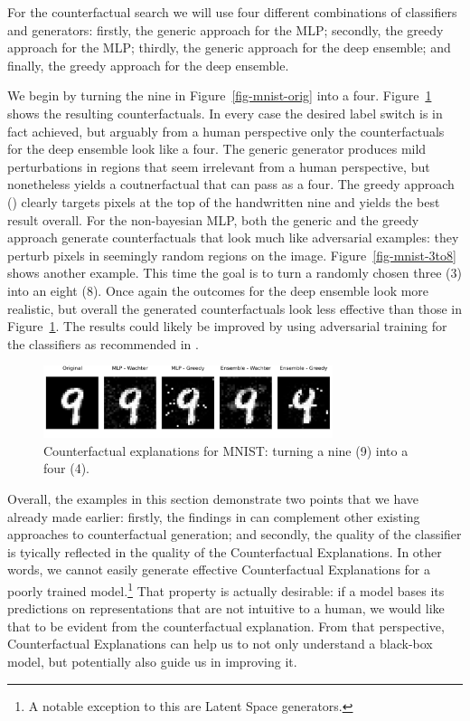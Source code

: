 \documentclass{juliacon}
\begin{document}
For the counterfactual search we will use four different combinations of
classifiers and generators: firstly, the generic approach for the MLP;
secondly, the greedy approach for the MLP; thirdly, the generic approach
for the deep ensemble; and finally, the greedy approach for the deep
ensemble.

We begin by turning the nine in Figure~\ref{fig-mnist-orig} into a four.
Figure~\ref{fig-mnist-9to4} shows the resulting counterfactuals. In
every case the desired label switch is in fact achieved, but arguably
from a human perspective only the counterfactuals for the deep ensemble
look like a four. The generic generator produces mild perturbations in
regions that seem irrelevant from a human perspective, but nonetheless
yields a coutnerfactual that can pass as a four. The greedy approach
(\cite{schut2021generating}) clearly targets pixels at the top of the
handwritten nine and yields the best result overall. For the
non-bayesian MLP, both the generic and the greedy approach generate
counterfactuals that look much like adversarial examples: they perturb
pixels in seemingly random regions on the image.
Figure~\ref{fig-mnist-3to8} shows another example. This time the goal is
to turn a randomly chosen three (3) into an eight (8). Once again the
outcomes for the deep ensemble look more realistic, but overall the
generated counterfactuals look less effective than those in
Figure~\ref{fig-mnist-9to4}. The results could likely be improved by
using adversarial training for the classifiers as recommended in
\cite{schut2021generating}.

\begin{figure}

{\centering \includegraphics[width=3.33333in,height=0.83333in]{www/mnist_9_to_4.png}

}

\caption{\label{fig-mnist-9to4}Counterfactual explanations for MNIST:
turning a nine (9) into a four (4).}

\end{figure}

Overall, the examples in this section demonstrate two points that we
have already made earlier: firstly, the findings in
\cite{schut2021generating} can complement other existing approaches to
counterfactual generation; and secondly, the quality of the classifier
is tyically reflected in the quality of the Counterfactual Explanations.
In other words, we cannot easily generate effective Counterfactual
Explanations for a poorly trained model.\footnote{A notable exception to
  this are Latent Space generators.} That property is actually
desirable: if a model bases its predictions on representations that are
not intuitive to a human, we would like that to be evident from the
counterfactual explanation. From that perspective, Counterfactual
Explanations can help us to not only understand a black-box model, but
potentially also guide us in improving it.
\end{document}
